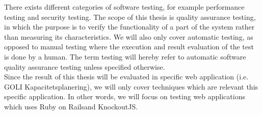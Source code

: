 There exists different categories of software testing, for example
performance testing and security testing. The scope of this thesis is
quality assurance testing, in which the purpose is to verify the
functionality of a part of the system rather than measuring its
characteristics. We will also only cover automatic testing, as opposed
to manual testing where the execution and result evaluation of the test
is done by a human. The term testing will hereby refer to automatic
software quality assurance testing unless specified otherwise.\\

Since the result of this thesis will be evaluated in specific web
application (i.e. GOLI Kapacitetsplanering), we will only cover
techniques which are relevant this specific application. In other words,
we will focus on testing web applications which uses Ruby on
Rails\footnotemark and KnockoutJS\footnotemark.\\


